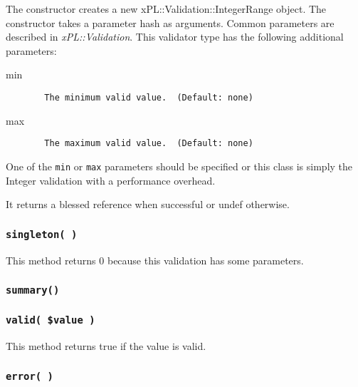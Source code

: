 \documentclass[12pt,a4paper]{article}
\begin{document}
The constructor creates a new xPL::Validation::IntegerRange object.
The constructor takes a parameter hash as arguments.  Common
parameters are described in \emph{xPL::Validation}.  This validator type
has the following additional parameters:

\begin{description}

\item[{min}] \mbox{}\begin{verbatim}
  The minimum valid value.  (Default: none)
\end{verbatim}

\item[{max}] \mbox{}\begin{verbatim}
  The maximum valid value.  (Default: none)
\end{verbatim}
\end{description}


One of the \texttt{min} or \texttt{max} parameters should be specified or this
class is simply the Integer validation with a performance overhead.



It returns a blessed reference when successful or undef otherwise.

\subsubsection*{\texttt{singleton( )}\label{xPL::Validation::IntegerRange_singleton_}}


This method returns 0 because this validation has some parameters.

\subsubsection*{\texttt{summary()}\label{xPL::Validation::IntegerRange_summary_}}
\subsubsection*{\texttt{valid( \$value )}\label{xPL::Validation::IntegerRange_valid_value_}}


This method returns true if the value is valid.

\subsubsection*{\texttt{error( )}\label{xPL::Validation::IntegerRange_error_}}
\end{document}

